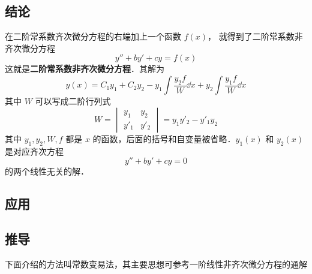 

\subsection{结论}

在二阶常系数齐次微分方程的右端加上一个函数 $f(x)$， 就得到了二阶常系数非齐次微分方程
\begin{equation}\label{Ode2N_eq1}
y'' + by' + cy = f(x)
\end{equation}
这就是\textbf{二阶常系数非齐次微分方程}．其解为
\begin{equation}
y(x) = C_1 y_1 + C_2 y_2 - y_1\int \frac{y_2 f}{W} \dd{x} + y_2\int \frac{y_1 f}{W} \dd{x}
\end{equation}
其中 $W$ 可以写成二阶行列式
\begin{equation}
W = 
\begin{vmatrix}
y_1 & y_2\\
y'_1 & y'_2
\end{vmatrix} = y_1 y'_2 - y'_1 y_2
\end{equation}
其中 $y_1, y_2, W, f$ 都是 $x$ 的函数，后面的括号和自变量被省略．$y_1(x)$ 和 $y_2(x)$ 是对应齐次方程 
\begin{equation}\label{Ode2N_eq4}
y'' + by' + cy = 0
\end{equation}
的两个线性无关的解．

\subsection{应用} %

\subsection{推导}

下面介绍的方法叫常数变易法，其主要思想可参考一阶线性非齐次微分方程的通解%


